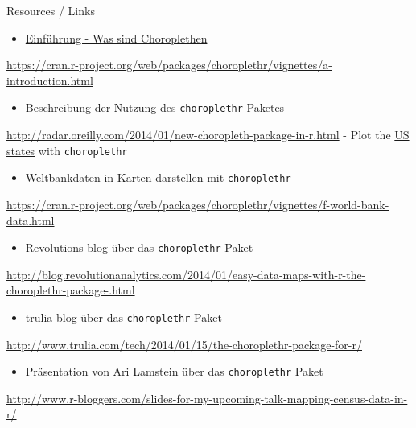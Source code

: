 \documentclass[ignorenonframetext,]{beamer}
\providecommand{\tightlist}{%
  \setlength{\itemsep}{0pt}\setlength{\parskip}{0pt}}
\begin{document}
\begin{frame}[fragile]{Resources / Links}

\begin{itemize}
\tightlist
\item
  \href{https://cran.r-project.org/web/packages/choroplethr/vignettes/a-introduction.html}{Einführung
  - Was sind Choroplethen}
\end{itemize}

\url{https://cran.r-project.org/web/packages/choroplethr/vignettes/a-introduction.html}

\begin{itemize}
\tightlist
\item
  \href{http://radar.oreilly.com/2014/01/new-choropleth-package-in-r.html}{Beschreibung}
  der Nutzung des \texttt{choroplethr} Paketes
\end{itemize}

\url{http://radar.oreilly.com/2014/01/new-choropleth-package-in-r.html}
- Plot the
\href{https://cran.r-project.org/web/packages/choroplethr/vignettes/b-state-choropleth.html}{US
states} with \texttt{choroplethr}

\begin{itemize}
\tightlist
\item
  \href{https://cran.r-project.org/web/packages/choroplethr/vignettes/f-world-bank-data.html}{Weltbankdaten
  in Karten darstellen} mit \texttt{choroplethr}
\end{itemize}

\url{https://cran.r-project.org/web/packages/choroplethr/vignettes/f-world-bank-data.html}

\begin{itemize}
\tightlist
\item
  \href{http://blog.revolutionanalytics.com/2014/01/easy-data-maps-with-r-the-choroplethr-package-.html}{Revolutions-blog}
  über das \texttt{choroplethr} Paket
\end{itemize}

\url{http://blog.revolutionanalytics.com/2014/01/easy-data-maps-with-r-the-choroplethr-package-.html}

\begin{itemize}
\tightlist
\item
  \href{http://www.trulia.com/tech/2014/01/15/the-choroplethr-package-for-r/}{trulia}-blog
  über das \texttt{choroplethr} Paket
\end{itemize}

\url{http://www.trulia.com/tech/2014/01/15/the-choroplethr-package-for-r/}

\begin{itemize}
\tightlist
\item
  \href{http://www.r-bloggers.com/slides-for-my-upcoming-talk-mapping-census-data-in-r/}{Präsentation
  von Ari Lamstein} über das \texttt{choroplethr} Paket
\end{itemize}

\url{http://www.r-bloggers.com/slides-for-my-upcoming-talk-mapping-census-data-in-r/}

\end{frame}
\end{document}
